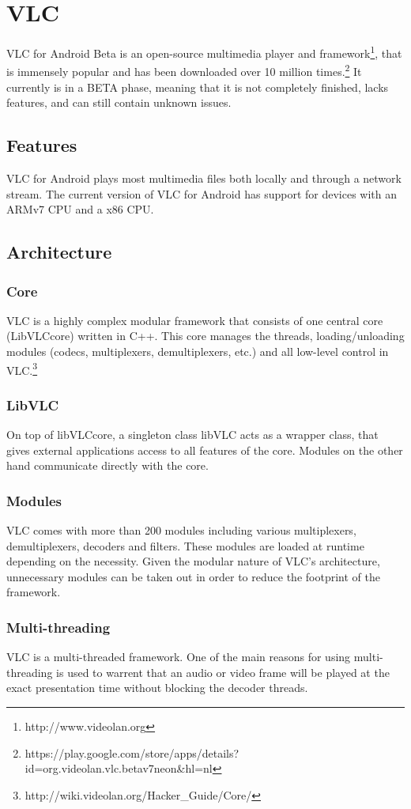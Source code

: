\section{VLC}
VLC for Android Beta is an open-source multimedia player and framework\footnote{http://www.videolan.org}, that is immensely popular and has been downloaded over 10 million times.\footnote{https://play.google.com/store/apps/details?id=org.videolan.vlc.betav7neon\&hl=nl} It currently is in a BETA phase, meaning that it is not completely finished, lacks features, and can still contain unknown issues. 
\subsection{Features}
VLC for Android plays most multimedia files both locally and through a network stream. The current version of VLC for Android has support for devices with an ARMv7 CPU and a x86 CPU.
\subsection{Architecture}
\subsubsection{Core}
VLC is a highly complex modular framework that consists of one central core (LibVLCcore) written in C++. This core manages the threads, loading/unloading modules (codecs, multiplexers, demultiplexers, etc.) and all low-level control in VLC.\footnote{http://wiki.videolan.org/Hacker\_Guide/Core/}
\subsubsection{LibVLC}
On top of libVLCcore, a singleton class libVLC acts as a wrapper class, that gives external applications access to all features of the core. Modules on the other hand communicate directly with the core.
\subsubsection{Modules}
VLC comes with more than 200 modules including various multiplexers, demultiplexers, decoders and filters. These modules are loaded at runtime depending on the necessity. Given the modular nature of VLC's architecture, unnecessary modules can be taken out in order to reduce the footprint of the framework.
\subsubsection{Multi-threading}
VLC is a multi-threaded framework. One of the main reasons for using multi-threading is used to warrent that an audio or video frame will be played at the exact presentation time without blocking the decoder threads.


